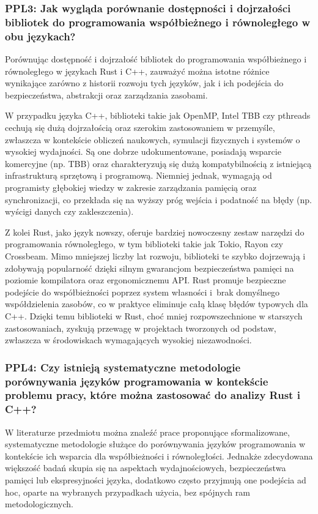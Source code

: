 \subsubsection{PPL3: Jak wygląda porównanie dostępności i dojrzałości bibliotek do programowania współbieżnego i równoległego w obu językach?}
Porównując dostępność i dojrzałość bibliotek do programowania współbieżnego i równoległego w językach Rust i C++, zauważyć można istotne różnice wynikające zarówno z historii rozwoju tych języków, jak i ich podejścia do bezpieczeństwa, abstrakcji oraz zarządzania zasobami.

W przypadku języka C++, biblioteki takie jak OpenMP, Intel TBB czy pthreads cechują się dużą dojrzałością oraz szerokim zastosowaniem w przemyśle, zwłaszcza w kontekście obliczeń naukowych, symulacji fizycznych i systemów o wysokiej wydajności. Są one dobrze udokumentowane, posiadają wsparcie komercyjne (np. TBB) oraz charakteryzują się dużą kompatybilnością z istniejącą infrastrukturą sprzętową i programową. Niemniej jednak, wymagają od programisty głębokiej wiedzy w zakresie zarządzania pamięcią oraz synchronizacji, co przekłada się na wyższy próg wejścia i podatność na błędy (np. wyścigi danych czy zakleszczenia).

Z kolei Rust, jako język nowszy, oferuje bardziej nowoczesny zestaw narzędzi do programowania równoległego, w tym biblioteki takie jak Tokio, Rayon czy Crossbeam. Mimo mniejszej liczby lat rozwoju, biblioteki te szybko dojrzewają i zdobywają popularność dzięki silnym gwarancjom bezpieczeństwa pamięci na poziomie kompilatora oraz ergonomicznemu API. Rust promuje bezpieczne podejście do współbieżności poprzez system własności  i~brak domyślnego współdzielenia zasobów, co w praktyce eliminuje całą klasę błędów typowych dla C++. Dzięki temu biblioteki w Rust, choć mniej rozpowszechnione w starszych zastosowaniach, zyskują przewagę w projektach tworzonych od podstaw, zwłaszcza w środowiskach wymagających wysokiej niezawodności.

\subsubsection{PPL4: Czy istnieją systematyczne metodologie porównywania języków programowania w kontekście problemu pracy, które można zastosować do analizy Rust i C++?}

W literaturze przedmiotu można znaleźć prace proponujące sformalizowane, systematyczne metodologie służące do porównywania języków programowania w kontekście ich wsparcia dla współbieżności i równoległości. Jednakże zdecydowana większość badań skupia się na aspektach wydajnościowych, bezpieczeństwa pamięci lub ekspresyjności języka, dodatkowo często przyjmują one podejścia ad hoc, oparte na wybranych przypadkach użycia, bez spójnych ram metodologicznych.

